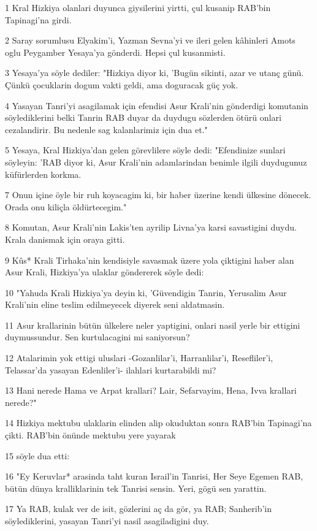 \par 1 Kral Hizkiya olanlari duyunca giysilerini yirtti, çul kusanip RAB'bin Tapinagi'na girdi.
\par 2 Saray sorumlusu Elyakim'i, Yazman Sevna'yi ve ileri gelen kâhinleri Amots oglu Peygamber Yesaya'ya gönderdi. Hepsi çul kusanmisti.
\par 3 Yesaya'ya söyle dediler: "Hizkiya diyor ki, 'Bugün sikinti, azar ve utanç günü. Çünkü çocuklarin dogum vakti geldi, ama doguracak güç yok.
\par 4 Yasayan Tanri'yi asagilamak için efendisi Asur Krali'nin gönderdigi komutanin söylediklerini belki Tanrin RAB duyar da duydugu sözlerden ötürü onlari cezalandirir. Bu nedenle sag kalanlarimiz için dua et."
\par 5 Yesaya, Kral Hizkiya'dan gelen görevlilere söyle dedi: "Efendinize sunlari söyleyin: 'RAB diyor ki, Asur Krali'nin adamlarindan benimle ilgili duydugunuz küfürlerden korkma.
\par 7 Onun içine öyle bir ruh koyacagim ki, bir haber üzerine kendi ülkesine dönecek. Orada onu kiliçla öldürtecegim."
\par 8 Komutan, Asur Krali'nin Lakis'ten ayrilip Livna'ya karsi savastigini duydu. Krala danismak için oraya gitti.
\par 9 Kûs* Krali Tirhaka'nin kendisiyle savasmak üzere yola çiktigini haber alan Asur Krali, Hizkiya'ya ulaklar göndererek söyle dedi:
\par 10 "Yahuda Krali Hizkiya'ya deyin ki, 'Güvendigin Tanrin, Yerusalim Asur Krali'nin eline teslim edilmeyecek diyerek seni aldatmasin.
\par 11 Asur krallarinin bütün ülkelere neler yaptigini, onlari nasil yerle bir ettigini duymussundur. Sen kurtulacagini mi saniyorsun?
\par 12 Atalarimin yok ettigi uluslari -Gozanlilar'i, Harranlilar'i, Resefliler'i, Telassar'da yasayan Edenliler'i- ilahlari kurtarabildi mi?
\par 13 Hani nerede Hama ve Arpat krallari? Lair, Sefarvayim, Hena, Ivva krallari nerede?"
\par 14 Hizkiya mektubu ulaklarin elinden alip okuduktan sonra RAB'bin Tapinagi'na çikti. RAB'bin önünde mektubu yere yayarak
\par 15 söyle dua etti:
\par 16 "Ey Keruvlar* arasinda taht kuran Israil'in Tanrisi, Her Seye Egemen RAB, bütün dünya kralliklarinin tek Tanrisi sensin. Yeri, gögü sen yarattin.
\par 17 Ya RAB, kulak ver de isit, gözlerini aç da gör, ya RAB; Sanherib'in söylediklerini, yasayan Tanri'yi nasil asagiladigini duy.
